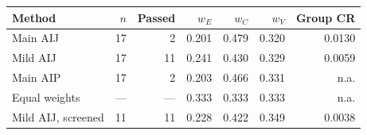 \begin{tabularx}{\linewidth}{@{}Xrrrrrr@{}}
\toprule
Method & $n$ & Passed & $w_E$ & $w_C$ & $w_V$ & Group CR\\
\midrule
Main AIJ & 17 & 2 & 0.201 & 0.479 & 0.320 & 0.0130\\
Mild AIJ & 17 & 11 & 0.241 & 0.430 & 0.329 & 0.0059\\
Main AIP & 17 & 2 & 0.203 & 0.466 & 0.331 & n.a.\\
Equal weights & --- & --- & 0.333 & 0.333 & 0.333 & n.a.\\
Mild AIJ, screened & 11 & 11 & 0.228 & 0.422 & 0.349 & 0.0038\\
\bottomrule
\end{tabularx}
